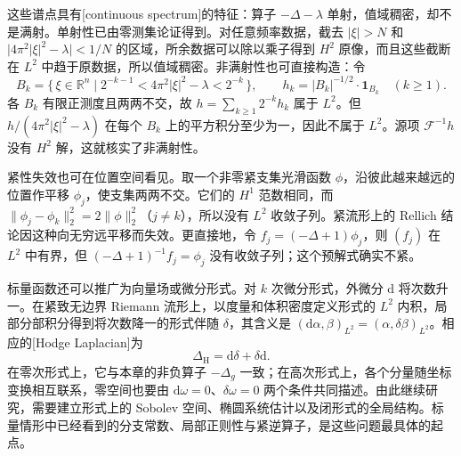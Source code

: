 \ProseParagraphBreak

这些谱点具有[continuous spectrum]的特征：算子 \(-\Delta-\lambda\) 单射，值域稠密，却不是满射。单射性已由零测集论证得到。对任意频率数据，截去 \(|\xi|>N\) 和 \(\bigl|4\pi^2|\xi|^2-\lambda\bigr|<1/N\) 的区域，所余数据可以除以乘子得到 \(H^2\) 原像，而且这些截断在 \(L^2\) 中趋于原数据，所以值域稠密。非满射性也可直接构造：令
\[
 B_k=\{\,\xi\in\mathbb R^n\mid 2^{-k-1}<4\pi^2|\xi|^2-\lambda<2^{-k}\,\},
 \qquad h_k=|B_k|^{-1/2}\cdot\mathbf1_{B_k}\quad(k\geq1).
\]
各 \(B_k\) 有限正测度且两两不交，故 \(h=\sum_{k\geq1}2^{-k}h_k\) 属于 \(L^2\)。但 \(h/(4\pi^2|\xi|^2-\lambda)\) 在每个 \(B_k\) 上的平方积分至少为一，因此不属于 \(L^2\)。源项 \(\mathcal F^{-1}h\) 没有 \(H^2\) 解，这就核实了非满射性。

\ProseParagraphBreak

紧性失效也可在位置空间看见。取一个非零紧支集光滑函数 \(\phi\)，沿彼此越来越远的位置作平移 \(\phi_j\)，使支集两两不交。它们的 \(H^1\) 范数相同，而 \(\|\phi_j-\phi_k\|_2^2=2\|\phi\|_2^2\)（\(j\ne k\)），所以没有 \(L^2\) 收敛子列。紧流形上的 Rellich 结论因这种向无穷远平移而失效。更直接地，令 \(f_j=(-\Delta+1)\phi_j\)，则 \((f_j)\) 在 \(L^2\) 中有界，但 \((-\Delta+1)^{-1}f_j=\phi_j\) 没有收敛子列；这个预解式确实不紧。

\ProseParagraphBreak

标量函数还可以推广为向量场或微分形式。对 \(k\) 次微分形式，外微分 \(\mathrm d\) 将次数升一。在紧致无边界 Riemann 流形上，以度量和体积密度定义形式的 \(L^2\) 内积，局部分部积分得到将次数降一的形式伴随 \(\delta\)，其含义是 \((\mathrm d\alpha,\beta)_{L^2}=(\alpha,\delta\beta)_{L^2}\)。相应的[Hodge Laplacian]为
\[
 \Delta_{\mathrm H}=\mathrm d\delta+\delta\mathrm d.
\]
在零次形式上，它与本章的非负算子 \(-\Delta_g\) 一致；在高次形式上，各个分量随坐标变换相互联系，零空间也要由 \(\mathrm d\omega=0\)、\(\delta\omega=0\) 两个条件共同描述。由此继续研究，需要建立形式上的 Sobolev 空间、椭圆系统估计以及闭形式的全局结构。标量情形中已经看到的分支常数、局部正则性与紧逆算子，是这些问题最具体的起点。
